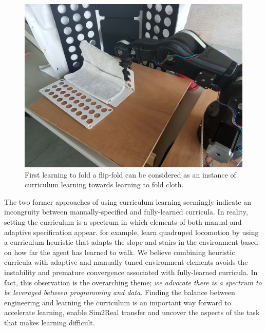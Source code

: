 \documentclass[\home/main.tex]{subfiles}
\begin{document}
\begin{figure}[!htpb]
    \includegraphics[width=\textwidth]{figures/flipfold_moveo.jpg}
    \caption[Illustration of folding with a flip-fold.]{First learning to fold a flip-fold can be considered as an instance of curriculum learning towards learning to fold cloth.}
    \label{fig:towards_flipfold}
\end{figure}

The two former approaches of using curriculum learning seemingly indicate an incongruity between manually-specified and fully-learned curricula. In reality, setting the curriculum is a spectrum in which elements of both manual and adaptive specification appear. \Textcite{rudin2021learning} for example, learn quadruped locomotion by using a curriculum heuristic that adapts the slope and stairs in the environment based on how far the agent has learned to walk.
We believe combining heuristic curricula with adaptive and manually-tuned environment elements avoids the instability and premature convergence associated with fully-learned curricula.
In fact, this observation is the overarching theme; \emph{we advocate there is a spectrum to be leveraged between programming and data}. Finding the balance between engineering and learning the curriculum is an important way forward to accelerate learning, enable Sim2Real transfer and uncover the aspects of the task that makes learning difficult.
\end{document}
